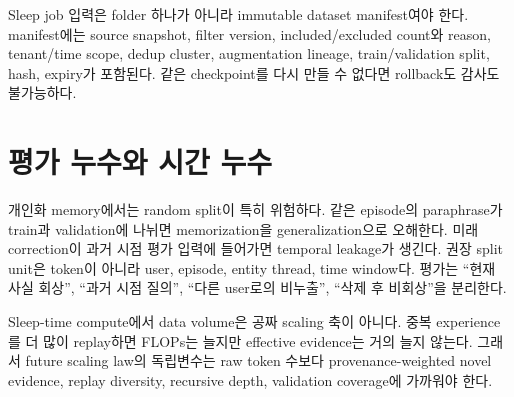 \begin{keypoint}
Sleep job 입력은 folder 하나가 아니라 immutable dataset manifest여야 한다. manifest에는 source
snapshot, filter version, included/excluded count와 reason, tenant/time scope, dedup cluster,
augmentation lineage, train/validation split, hash, expiry가 포함된다. 같은 checkpoint를 다시 만들 수
없다면 rollback도 감사도 불가능하다.
\end{keypoint}

\section{평가 누수와 시간 누수}

개인화 memory에서는 random split이 특히 위험하다. 같은 episode의 paraphrase가 train과 validation에
나뉘면 memorization을 generalization으로 오해한다. 미래 correction이 과거 시점 평가 입력에 들어가면
temporal leakage가 생긴다. 권장 split unit은 token이 아니라 user, episode, entity thread, time window다.
평가는 ``현재 사실 회상'', ``과거 시점 질의'', ``다른 user로의 비누출'', ``삭제 후 비회상''을 분리한다.

Sleep-time compute에서 data volume은 공짜 scaling 축이 아니다. 중복 experience를 더 많이 replay하면
FLOPs는 늘지만 effective evidence는 거의 늘지 않는다. 그래서 future scaling law의 독립변수는 raw
token 수보다 provenance-weighted novel evidence, replay diversity, recursive depth, validation coverage에
가까워야 한다.
